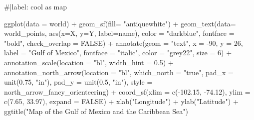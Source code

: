 \documentclass[
  letterpaper,
  DIV=11,
  numbers=noendperiod]{scrartcl}
\newenvironment{Shaded}{\begin{snugshade}}{\end{snugshade}}
\newcommand{\AttributeTok}[1]{\textcolor[rgb]{0.40,0.45,0.13}{#1}}
\newcommand{\CommentTok}[1]{\textcolor[rgb]{0.37,0.37,0.37}{#1}}
\newcommand{\ConstantTok}[1]{\textcolor[rgb]{0.56,0.35,0.01}{#1}}
\newcommand{\DecValTok}[1]{\textcolor[rgb]{0.68,0.00,0.00}{#1}}
\newcommand{\FloatTok}[1]{\textcolor[rgb]{0.68,0.00,0.00}{#1}}
\newcommand{\FunctionTok}[1]{\textcolor[rgb]{0.28,0.35,0.67}{#1}}
\newcommand{\NormalTok}[1]{\textcolor[rgb]{0.00,0.23,0.31}{#1}}
\newcommand{\SpecialCharTok}[1]{\textcolor[rgb]{0.37,0.37,0.37}{#1}}
\newcommand{\StringTok}[1]{\textcolor[rgb]{0.13,0.47,0.30}{#1}}
\begin{document}
\begin{Shaded}
\begin{Highlighting}[]
\CommentTok{\#|label: cool as map}

\FunctionTok{ggplot}\NormalTok{(}\AttributeTok{data =}\NormalTok{ world) }\SpecialCharTok{+} 
  \FunctionTok{geom\_sf}\NormalTok{(}\AttributeTok{fill=} \StringTok{"antiquewhite"}\NormalTok{) }\SpecialCharTok{+} 
  \FunctionTok{geom\_text}\NormalTok{(}\AttributeTok{data=}\NormalTok{ world\_points,}
            \FunctionTok{aes}\NormalTok{(}\AttributeTok{x=}\NormalTok{X, }
                \AttributeTok{y=}\NormalTok{Y, }
                \AttributeTok{label=}\NormalTok{name), }
            \AttributeTok{color =} \StringTok{"darkblue"}\NormalTok{, }
            \AttributeTok{fontface =} \StringTok{"bold"}\NormalTok{, }
            \AttributeTok{check\_overlap =} \ConstantTok{FALSE}\NormalTok{) }\SpecialCharTok{+} 
  \FunctionTok{annotate}\NormalTok{(}\AttributeTok{geom =} \StringTok{"text"}\NormalTok{, }
           \AttributeTok{x =} \SpecialCharTok{{-}}\DecValTok{90}\NormalTok{, }
           \AttributeTok{y =} \DecValTok{26}\NormalTok{, }
           \AttributeTok{label =} \StringTok{"Gulf of Mexico"}\NormalTok{, }
           \AttributeTok{fontface =} \StringTok{"italic"}\NormalTok{, }
           \AttributeTok{color =} \StringTok{"grey22"}\NormalTok{, }
           \AttributeTok{size =} \DecValTok{6}\NormalTok{) }\SpecialCharTok{+} 
  \FunctionTok{annotation\_scale}\NormalTok{(}\AttributeTok{location =} \StringTok{"bl"}\NormalTok{, }
                   \AttributeTok{width\_hint =} \FloatTok{0.5}\NormalTok{) }\SpecialCharTok{+} 
  \FunctionTok{annotation\_north\_arrow}\NormalTok{(}\AttributeTok{location =} \StringTok{"bl"}\NormalTok{, }
                         \AttributeTok{which\_north =} \StringTok{"true"}\NormalTok{, }
                         \AttributeTok{pad\_x =} \FunctionTok{unit}\NormalTok{(}\FloatTok{0.75}\NormalTok{, }\StringTok{"in"}\NormalTok{), }
                         \AttributeTok{pad\_y =} \FunctionTok{unit}\NormalTok{(}\FloatTok{0.5}\NormalTok{, }\StringTok{"in"}\NormalTok{), }
                         \AttributeTok{style =}\NormalTok{ north\_arrow\_fancy\_orienteering) }\SpecialCharTok{+} 
  \FunctionTok{coord\_sf}\NormalTok{(}\AttributeTok{xlim =} \FunctionTok{c}\NormalTok{(}\SpecialCharTok{{-}}\FloatTok{102.15}\NormalTok{, }\SpecialCharTok{{-}}\FloatTok{74.12}\NormalTok{), }
           \AttributeTok{ylim =} \FunctionTok{c}\NormalTok{(}\FloatTok{7.65}\NormalTok{, }\FloatTok{33.97}\NormalTok{), }
           \AttributeTok{expand =} \ConstantTok{FALSE}\NormalTok{) }\SpecialCharTok{+} 
  \FunctionTok{xlab}\NormalTok{(}\StringTok{"Longitude"}\NormalTok{) }\SpecialCharTok{+} 
  \FunctionTok{ylab}\NormalTok{(}\StringTok{"Latitude"}\NormalTok{) }\SpecialCharTok{+} 
  \FunctionTok{ggtitle}\NormalTok{(}\StringTok{"Map of the Gulf of Mexico and the Caribbean Sea"}\NormalTok{) }
\end{Highlighting}
\end{Shaded}
\end{document}
